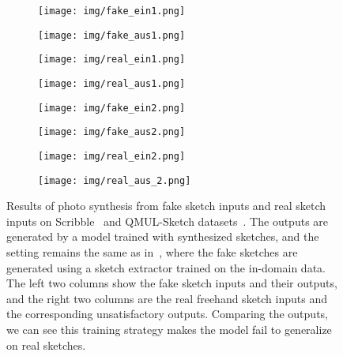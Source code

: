 \documentclass[10pt,twocolumn,letterpaper]{article}
\begin{document}
\begin{figure}[tbp]
\captionsetup[subfigure]{labelformat=empty}
\begin{center}
  \begin{subfigure}[b]{0.23\linewidth}
  \texttt{[image: img/fake\_ein1.png]}
  \end{subfigure}
  \begin{subfigure}[b]{0.23\linewidth}
  \texttt{[image: img/fake\_aus1.png]}
  \end{subfigure}\hfill \begin{subfigure}[b]{0.23\linewidth}
  \texttt{[image: img/real\_ein1.png]}
  \end{subfigure}
  \begin{subfigure}[b]{0.23\linewidth}
  \texttt{[image: img/real\_aus1.png]}
  \end{subfigure}
  
  \begin{subfigure}[b]{0.23\linewidth}
  \texttt{[image: img/fake\_ein2.png]}
  \end{subfigure}
  \begin{subfigure}[b]{0.23\linewidth}
  \texttt{[image: img/fake\_aus2.png]}
  \end{subfigure}\hfill \begin{subfigure}[b]{0.23\linewidth}
  \texttt{[image: img/real\_ein2.png]}
  \end{subfigure}
  \begin{subfigure}[b]{0.23\linewidth}
  \texttt{[image: img/real\_aus\_2.png]}
  \end{subfigure}
\end{center}
\caption{Results of photo synthesis from fake sketch inputs and real sketch inputs on Scribble~\cite{ghosh2019interactive} and QMUL-Sketch datasets~\cite{yu2016sketch,song2017deep,liu2019unpaired}. The outputs are generated by a model trained with synthesized sketches, and the setting remains the same as in~\cite{liu2019unpaired}, where the fake sketches are generated using a sketch extractor trained on the in-domain data. The left two columns show the fake sketch inputs and their outputs, and the right two columns are the real freehand sketch inputs and the corresponding unsatisfactory outputs. Comparing the outputs, we can see this training strategy makes the model fail to generalize on real sketches. }
 \label{fig:fixed_failed_sketch}
\end{figure}
\end{document}
